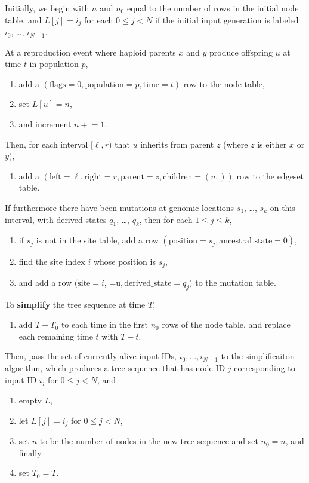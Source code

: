 \documentclass{article}
\begin{document}
Initially, we begin with $n$ and $n_0$ equal to the number of rows in the initial node table,
and $L[j] = i_j$ for each $0 \le j < N$ if the initial input generation is labeled
$i_0$, \ldots, $i_{N-1}$.

At a reproduction event where haploid parents $x$ and $y$ produce offspring $u$
at time $t$ in population $p$,
\begin{enumerate}
    \item add a
        $(
        \text{flags}=0,
        \text{population}=p,
        \text{time}=t)$ row to the node table,
    \item set $L[u] = n$,
    \item and increment $n\mathrel{+}=1$.
\end{enumerate}
Then, for each interval $[\ell,r)$ that $u$ inherits from parent $z$
(where $z$ is either $x$ or $y$),
\begin{enumerate}[resume]
    \item add a
        $( \text{left}=\ell,
        \text{right}=r,
        \text{parent}=z,
        \text{children}=(u,))$ row to the edgeset table.
\end{enumerate}
If furthermore there have been mutations at genomic locations $s_1$, \ldots, $s_k$
on this interval,
with derived states $q_1$, \ldots, $q_k$,
then for each $1 \le j \le k$,
\begin{enumerate}[resume]
    \item if $s_j$ is not in the site table, add a row
        $( \text{position}=s_j,
        \text{ancestral\_state}=0)$,
    \item find the site index $i$ whose position is $s_j$,
    \item and add a row
        $( \text{site}=i$,
           =u$,
        \text{derived\_state}=q_j)$ to the mutation table.
\end{enumerate}

To \textbf{simplify} the tree sequence at time $T$,
\begin{enumerate}
    \item add $T-T_0$ to each time in the first $n_0$ rows of the node table,
        and replace each remaining time $t$ with $T-t$.
\end{enumerate}
Then, pass the set of currently alive input IDs,
$i_0, \ldots, i_{N-1}$ to the simplificaiton algorithm,
which produces a tree sequence that has node ID $j$ corresponding to input ID $i_j$
for $0 \le j < N$, and
\begin{enumerate}[resume]
    \item empty $L$,
    \item let $L[j] = i_j$ for $0 \le j < N$,
    \item set $n$ to be the number of nodes in the new tree sequence and set $n_0 = n$, and finally
    \item set $T_0 = T$.
\end{enumerate}
\end{document}
